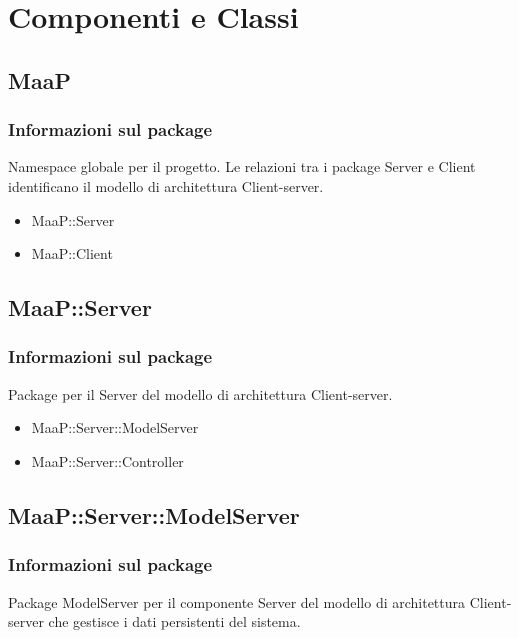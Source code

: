 \newpage
\section{Componenti e Classi}

\subsection{MaaP}
\subsubsection{Informazioni sul package}
Namespace globale per il progetto. Le relazioni tra i package Server e Client identificano il modello di architettura Client-server.
\begin{itemize}
\item MaaP::Server
\item MaaP::Client
\end{itemize}

\subsection{MaaP::Server}
\subsubsection{Informazioni sul package}
Package per il  Server del modello di architettura Client-server.
\begin{itemize}
\item MaaP::Server::ModelServer
\item MaaP::Server::Controller
\end{itemize}

\subsection{MaaP::Server::ModelServer}
\subsubsection{Informazioni sul package}
Package ModelServer per il componente Server del modello di architettura Client-server che gestisce i dati persistenti del sistema.

